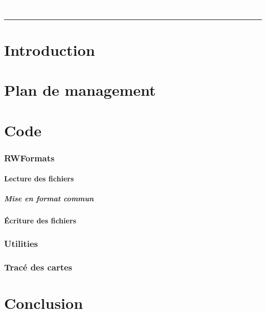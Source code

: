 \documentclass[11p, a4papert]{article}
\author{%
    Anthony Delannoy \\
    \texttt{anthony.delannoy@etu.enseeiht.fr}\vspace{40pt} \\
    Benoit Madiot \\
    \texttt{benoit.madiot@etu.enseeiht.fr}\vspace{40pt} \\
    Jérôme Combaniere \\
    \texttt{jerome.combaniere@etu.enseeiht.fr} 
    }
\makeatletter
\def\printauthor{%
    {\large \@author}}
\makeatother
\begin{document}
\begin{titlepage}
\BgThispage
{}
\vspace*{0.4\textheight}
\noindent
\textcolor{white}{\huge\textbf{\textsf{Méthode de lissage appliquées aux trajectoires ARGOS}}}
\vspace*{3cm}\par
\noindent
\begin{minipage}{0.5\linewidth}
    \begin{flushright}
        \printauthor
    \end{flushright}
\end{minipage} \hspace{15pt}
%
\begin{minipage}{0.02\linewidth}
    \rule{1pt}{175pt}
\end{minipage} \hspace{-10pt}
%
\begin{minipage}{0.63\linewidth}
\vspace{5pt}
    \begin{abstract} 
\lipsum[1]
    \end{abstract}
\end{minipage}
\end{titlepage}
\restoregeometry

\newpage
\thispagestyle{empty}
\tableofcontents
\newpage


\part{Introduction}
\part{Plan de management} %
\part{Code}
\section{RWFormats}
\subsection{Lecture des fichiers}
\subsubsection{Mise en format commun}
\subsection{Écriture des fichiers} %
\section{Utilities}
\section{Tracé des cartes}
\part{Conclusion}
\end{document}
